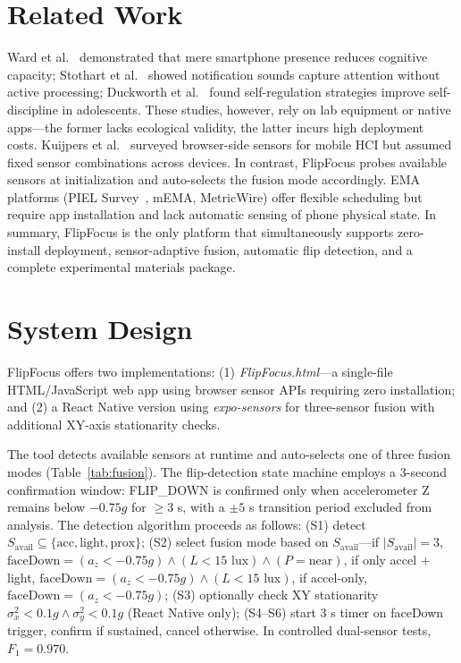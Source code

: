 \documentclass[sigconf]{acmart}
\begin{document}
\section{Related Work}

Ward et al.~\cite{ward2017brain} demonstrated that mere smartphone presence reduces cognitive capacity; Stothart et al.~\cite{stothart2015attentional} showed notification sounds capture attention without active processing; Duckworth et al.~\cite{duckworth2011self} found self-regulation strategies improve self-discipline in adolescents. These studies, however, rely on lab equipment or native apps---the former lacks ecological validity, the latter incurs high deployment costs. Kuijpers et al.~\cite{kuijpers2022browser} surveyed browser-side sensors for mobile HCI but assumed fixed sensor combinations across devices. In contrast, FlipFocus probes available sensors at initialization and auto-selects the fusion mode accordingly. EMA platforms (PIEL Survey~\cite{kubiak2015piel}, mEMA, MetricWire) offer flexible scheduling but require app installation and lack automatic sensing of phone physical state. In summary, FlipFocus is the only platform that simultaneously supports zero-install deployment, sensor-adaptive fusion, automatic flip detection, and a complete experimental materials package.

\section{System Design}

FlipFocus offers two implementations: (1) \textit{FlipFocus.html}---a single-file HTML/JavaScript web app using browser sensor APIs requiring zero installation; and (2) a React Native version using \textit{expo-sensors} for three-sensor fusion with additional XY-axis stationarity checks.

The tool detects available sensors at runtime and auto-selects one of three fusion modes (Table~\ref{tab:fusion}). The flip-detection state machine employs a 3-second confirmation window: FLIP\_DOWN is confirmed only when accelerometer Z remains below $-0.75g$ for $\ge 3$ s, with a $\pm 5$ s transition period excluded from analysis. The detection algorithm proceeds as follows: (S1) detect $S_{\text{avail}} \subseteq \{\text{acc}, \text{light}, \text{prox}\}$; (S2) select fusion mode based on $S_{\text{avail}}$---if $|S_{\text{avail}}|=3$, $\text{faceDown} = (a_z < -0.75g) \land (L < 15\text{ lux}) \land (P = \text{near})$, if only accel + light, $\text{faceDown} = (a_z < -0.75g) \land (L < 15\text{ lux})$, if accel-only, $\text{faceDown} = (a_z < -0.75g)$; (S3) optionally check XY stationarity $\sigma^2_x < 0.1g \land \sigma^2_y < 0.1g$ (React Native only); (S4--S6) start 3 s timer on faceDown trigger, confirm if sustained, cancel otherwise. In controlled dual-sensor tests, $F_1 = 0.970$.
\end{document}
